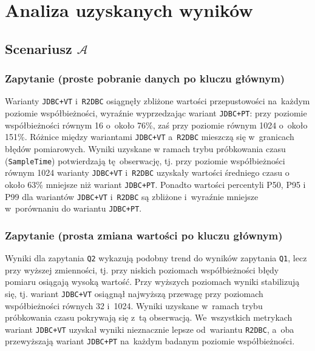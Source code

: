 \FloatBarrier
\section{Analiza uzyskanych wyników}
\label{sec:analysis}

\subsection{Scenariusz \ensuremath{\mathcal{A}}}

\subsubsection{Zapytanie  (proste pobranie danych po kluczu głównym)}

Warianty \texttt{JDBC+VT} i~\texttt{R2DBC} osiągnęły zbliżone wartości przepustowości na~każdym poziomie współbieżności, wyraźnie wyprzedzając wariant \texttt{JDBC+PT}: przy poziomie współbieżności równym 16 o~około 76\%, zaś przy poziomie równym 1024 o~około 151\%. Różnice między wariantami \texttt{JDBC+VT} a~\texttt{R2DBC} mieszczą się w~granicach błędów pomiarowych. Wyniki uzyskane w ramach trybu próbkowania czasu (\texttt{SampleTime}) potwierdzają tę~obserwację, tj. przy poziomie współbieżności równym 1024 warianty \texttt{JDBC+VT} i~\texttt{R2DBC} uzyskały wartości średniego czasu o około 63\% mniejsze niż wariant \texttt{JDBC+PT}. Ponadto wartości percentyli P50, P95 i P99 dla wariantów \texttt{JDBC+VT} i~\texttt{R2DBC} są zbliżone i~wyraźnie mniejsze w~porównaniu do wariantu \texttt{JDBC+PT}.

\subsubsection{Zapytanie  (prosta zmiana wartości po kluczu głównym)}

Wyniki dla zapytania \texttt{Q2} wykazują podobny trend do wyników zapytania \texttt{Q1}, lecz przy wyższej zmienności, tj. przy niskich poziomach współbieżności błędy pomiaru osiągają wysoką wartość. Przy wyższych poziomach wyniki stabilizują się, tj. wariant \texttt{JDBC+VT} osiągnął najwyższą przewagę przy poziomach współbieżności równych 32 i~1024. Wyniki uzyskane w~ramach trybu próbkowania czasu pokrywają się z~tą obserwacją. We~wszystkich metrykach wariant \texttt{JDBC+VT} uzyskał wyniki nieznacznie lepsze od~wariantu \texttt{R2DBC}, a~oba przewyższają wariant \texttt{JDBC+PT} na~każdym badanym poziomie współbieżności.

